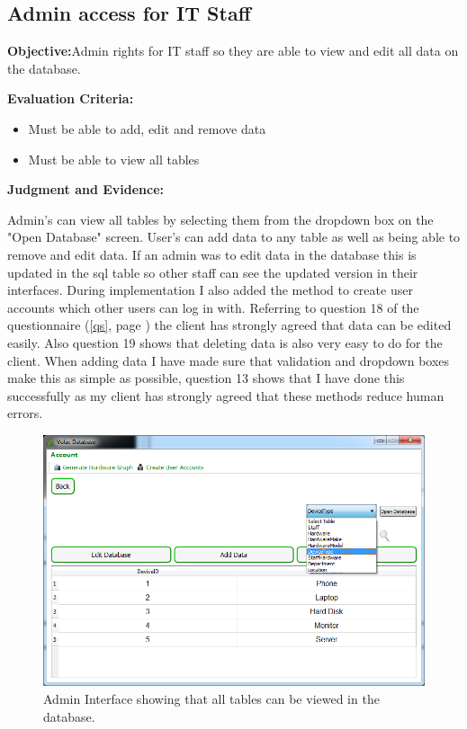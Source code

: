 \subsection{Admin access for IT Staff}\label{admin}

\textbf{Objective:}Admin rights for IT staff so they are able to view and edit all data on the database.

\textbf{Evaluation Criteria:}
\begin{itemize}
\item{Must be able to add, edit and remove data}
\item{Must be able to view all tables}
\end{itemize}

\textbf{Judgment and Evidence:}

Admin's can view all tables by selecting them from the dropdown box on the "Open Database" screen. User's can add data to any table as well as being able to remove and edit data. If an admin was to edit data in the database this is updated in the sql table so other staff can see the updated version in their interfaces. During implementation I also added the method to create user accounts which other users can log in with. Referring to question 18 of the questionnaire (\ref{qs}, page \pageref{qs}) the client has strongly agreed that data can be edited easily. Also question 19 shows that deleting data is also very easy to do for the client. When adding data I have made sure that validation and dropdown boxes make this as simple as possible, question 13 shows that I have done this successfully as my client has strongly agreed that these methods reduce human errors.

\begin{figure}[H]
    \includegraphics[width=\textwidth]{./Evaluation/Images/admin1.png}
    \caption{Admin Interface showing that all tables can be viewed in the database.} 
\end{figure}

